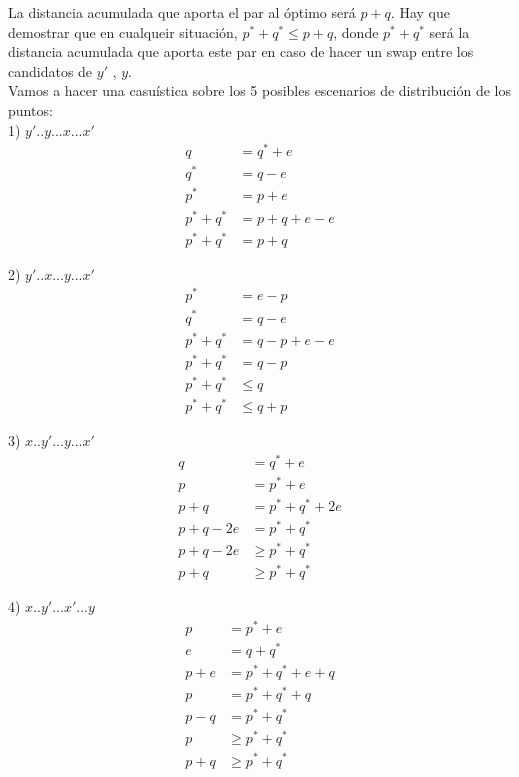 \documentclass{article}
\begin{document}
La distancia acumulada que aporta el par al \'optimo ser\'a $p+q$. Hay que demostrar que en cualqueir situaci\'on, $p^*+q^* \leq p+q$, donde $p^*+q^*$ ser\'a la distancia acumulada que aporta este par en caso de hacer un swap entre los candidatos de $y'$ , $y$.\\

Vamos a hacer una casu\'istica sobre los 5 posibles escenarios de distribuci\'on de los puntos:\\

1) $y'..y...x...x'$\\
    \begin{align}
        q &= q^*+e\\
        q^* &= q-e\\
        p^* &= p+e\\
        p^*+q^* &= p+q+e-e\\
        p^*+q^* &= p+q
    \end{align}
 

2) $y'..x...y...x'$\\
    \begin{align}
        p^* &= e-p\\
        q^* &= q-e\\
        p^*+q^* &= q-p+e-e\\
        p^*+q^* &= q-p\\
        p^*+q^* &\leq q\\
        p^*+q^* &\leq q+p
    \end{align}
    
3) $x..y'...y...x'$\\
    \begin{align}
        q &= q^*+e\\
        p &= p^*+e\\
        p+q &= p^*+q^*+2e\\
        p+q-2e &= p^*+q^*\\
        p+q-2e &\geq p^*+q^*\\
        p+q &\geq p^*+q^*
    \end{align}

4) $x..y'...x'...y$\\
    \begin{align}
        p &= p^*+e\\
        e &= q+q^*\\
        p+e &= p^*+q^*+e+q\\
        p &= p^*+q^*+q\\
        p-q &= p^*+q^*\\
        p&\geq p^*+q^*\\
        p+q&\geq p^*+q^*\\
    \end{align}
\end{document}
